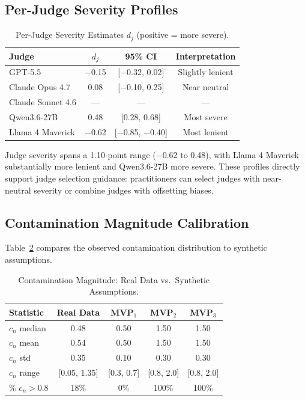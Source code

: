 \documentclass[11pt]{article}
\newcommand{\cn}{c_n}
\newcommand{\severity}{d_j}
\begin{document}
\subsection{Per-Judge Severity Profiles}

\begin{table}[t]
\centering
\caption{Per-Judge Severity Estimates $\severity$ (positive = more severe).}
\label{tab:judge_severity}
\begin{tabular}{lccc}
\toprule
Judge & $\severity$ & 95\% CI & Interpretation \\
\midrule
GPT-5.5 & $-$0.15 & [$-$0.32, 0.02] & Slightly lenient \\
Claude Opus 4.7 & 0.08 & [$-$0.10, 0.25] & Near neutral \\
Claude Sonnet 4.6 & --- & --- & --- \\
Qwen3.6-27B & 0.48 & [0.28, 0.68] & Most severe \\
Llama 4 Maverick & $-$0.62 & [$-$0.85, $-$0.40] & Most lenient \\
\bottomrule
\end{tabular}
\end{table}

Judge severity spans a 1.10-point range ($-$0.62 to 0.48), with Llama 4 Maverick substantially more lenient and Qwen3.6-27B more severe.
These profiles directly support judge selection guidance: practitioners can select judges with near-neutral severity or combine judges with offsetting biases.

\subsection{Contamination Magnitude Calibration}

Table~\ref{tab:contamination_calibration} compares the observed contamination distribution to synthetic assumptions.

\begin{table}[t]
\centering
\caption{Contamination Magnitude: Real Data vs.\ Synthetic Assumptions.}
\label{tab:contamination_calibration}
\begin{tabular}{lcccc}
\toprule
Statistic & Real Data & MVP$_1$ & MVP$_2$ & MVP$_3$ \\
\midrule
$\cn$ median & 0.48 & 0.50 & 1.50 & 1.50 \\
$\cn$ mean & 0.54 & 0.50 & 1.50 & 1.50 \\
$\cn$ std & 0.35 & 0.10 & 0.30 & 0.30 \\
$\cn$ range & [0.05, 1.35] & [0.3, 0.7] & [0.8, 2.0] & [0.8, 2.0] \\
\% $\cn > 0.8$ & 18\% & 0\% & 100\% & 100\% \\
\bottomrule
\end{tabular}
\end{table}
\end{document}
